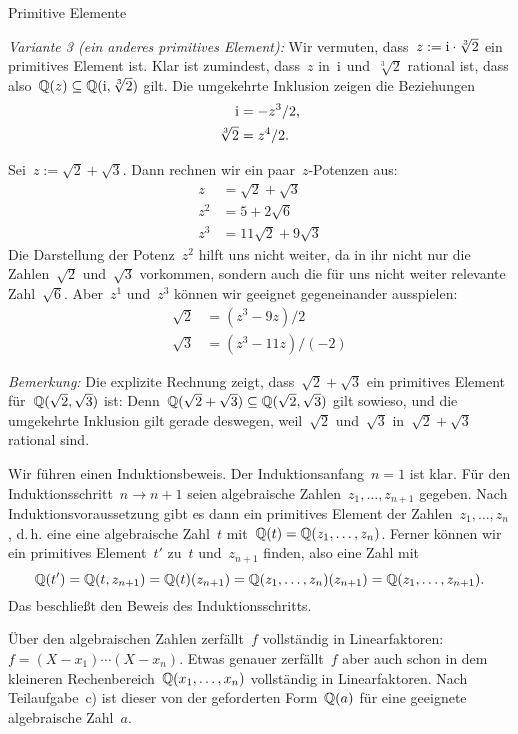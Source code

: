 \documentclass{algblatt}
\begin{document}
\begin{aufgabe}{Primitive Elemente}
\begin{loesungE}
\emph{Variante 3 (ein anderes primitives Element):}
Wir vermuten, dass~$z := \mathrm{i} \cdot \sqrt[3]{2}$ ein primitives Element ist. Klar
ist zumindest, dass~$z$ in~$\mathrm{i}$ und~$\sqrt[3]{2}$ rational ist, dass
also~$\mathbb{Q}(z) \subseteq \mathbb{Q}(\mathrm{i},\sqrt[3]{2})$ gilt. Die umgekehrte Inklusion
zeigen die Beziehungen
\begin{align*}
  \mathrm{i} &= -z^3/2, \\
  \sqrt[3]{2} &= z^4/2.
\end{align*}

\item Sei~$z := \sqrt{2} + \sqrt{3}$. Dann rechnen wir ein paar~$z$-Potenzen
aus:
\begin{align*}
  z &= \sqrt{2} + \sqrt{3} \\
  z^2 &= 5 + 2 \sqrt{6} \\
  z^3 &= 11\sqrt{2} + 9\sqrt{3}
\end{align*}
Die Darstellung der Potenz~$z^2$ hilft uns nicht weiter, da in ihr nicht nur
die Zahlen~$\sqrt{2}$ und~$\sqrt{3}$ vorkommen, sondern auch die für uns nicht
weiter relevante Zahl~$\sqrt{6}$. Aber~$z^1$ und~$z^3$ können wir geeignet
gegeneinander ausspielen:
\begin{align*}
  \sqrt{2} &= (z^3 - 9z) / 2 \\
  \sqrt{3} &= (z^3 - 11z) / (-2)
\end{align*}

\emph{Bemerkung:} Die explizite Rechnung zeigt, dass~$\sqrt{2}+\sqrt{3}$ ein
primitives Element für~$\mathbb{Q}(\sqrt{2},\sqrt{3})$ ist:
Denn~$\mathbb{Q}(\sqrt{2}+\sqrt{3}) \subseteq \mathbb{Q}(\sqrt{2},\sqrt{3})$ gilt sowieso,
und die umgekehrte Inklusion gilt gerade deswegen, weil~$\sqrt{2}$
und~$\sqrt{3}$ in~$\sqrt{2}+\sqrt{3}$ rational sind.

\item Wir führen einen Induktionsbeweis. Der Induktionsanfang~$n = 1$ ist klar.
Für den Induktionsschritt~$n \to n + 1$ seien algebraische
Zahlen~$z_1,\ldots,z_{n+1}$ gegeben. Nach Induktionsvoraussetzung gibt es dann
ein primitives Element der Zahlen~$z_1,\ldots,z_n$, d.\,h. eine
eine algebraische Zahl~$t$ mit~$\mathbb{Q}(t) = \mathbb{Q}(z_1,\ldots,z_n)$. Ferner können
wir ein primitives Element~$t'$ zu~$t$ und~$z_{n+1}$ finden, also eine Zahl mit
\[ \mathbb{Q}(t') = \mathbb{Q}(t,z_{n+1}) = \mathbb{Q}(t)(z_{n+1}) = \mathbb{Q}(z_1,\ldots,z_n)(z_{n+1}) =
\mathbb{Q}(z_1,\ldots,z_{n+1}). \]
Das beschließt den Beweis des Induktionsschritts.

\item Über den algebraischen Zahlen zerfällt~$f$ vollständig in
Linearfaktoren:~$f = (X-x_1) \cdots (X-x_n)$. Etwas genauer zerfällt~$f$ aber
auch schon in dem kleineren Rechenbereich~$\mathbb{Q}(x_1,\ldots,x_n)$ vollständig in
Linearfaktoren. Nach Teilaufgabe~c) ist dieser von der geforderten
Form~$\mathbb{Q}(a)$ für eine geeignete algebraische Zahl~$a$.
\end{loesungE}
\end{aufgabe}
\end{document}
